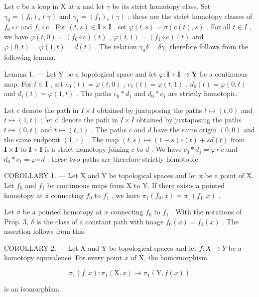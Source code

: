 Let c be a loop in X at x and let \(\gamma\) be its strict homotopy class. Set \(\gamma_{0} = (f_{0})_{*}(\gamma)\) and \(\gamma_{1} = (f_{1})_{*}(\gamma)\) ; these are the strict homotopy classes of \(f_{0} \circ c\) and \(f_{1} \circ c\) . For \((t, s) \in \mathbf{I} \times \mathbf{I}\) , set \(\varphi(t, s) = \sigma(c(t), s)\) . For all \(t \in I\) , we have \(\varphi(t, 0) = (f_{0} \circ c)(t)\) , \(\varphi(t, 1) = (f_{1} \circ c)(t)\) and \(\varphi(0, t) = \varphi(1, t) = d(t)\) . The relation \(\gamma_{0}\delta = \delta\gamma_{1}\) therefore follows from the following lemma.

Lemma 1. --- Let Y be a topological space and let \(\varphi\colon\mathbf{I}\times\mathbf{I}\to\mathbf{Y}\) be a continuous map. For \(t\in\mathbf{I}\) , set \(c_{0}(t)=\varphi(t,0)\) , \(c_{1}(t)=\varphi(t,1)\) , \(d_{0}(t)=\varphi(0,t)\) and \(d_{1}(t)=\varphi(1,t)\) . The paths \(c_{0}*d_{1}\) and \(d_{0}*c_{1}\) are strictly homotopic.

Let c denote the path in \(I \times I\) obtained by juxtaposing the paths \(t \mapsto (t,0)\) and \(t \mapsto (1,t)\) ; let d denote the path in \(I \times I\) obtained by juxtaposing the paths \(t \mapsto (0, t)\) and \(t \mapsto (t, 1)\) . The paths \(c\) and \(d\) have the same origin \((0, 0)\) and the same endpoint \((1, 1)\) . The map \((t, s) \mapsto (1 - s)c(t) + sd(t)\) from \(\mathbf{I} \times \mathbf{I}\) to \(\mathbf{I} \times \mathbf{I}\) is a strict homotopy joining \(c\) to \(d\) . We have \(c_0 * d_1 = \varphi \circ c\) and \(d_0 * c_1 = \varphi \circ d\) ; these two paths are therefore strictly homotopic.

COROLLARY 1. --- Let X and Y be topological spaces and let x be a point of X. Let \(f_0\) and \(f_1\) be continuous maps from X to Y. If there exists a pointed homotopy at x connecting \(f_0\) to \(f_1\) , we have \(\pi_1(f_0, x) = \pi_1(f_1, x)\) .

Let \(\sigma\) be a pointed homotopy at \(x\) connecting \(f_0\) to \(f_1\) . With the notations of Prop. 3, \(\delta\) is the class of a constant path with image \(f_0(x) = f_1(x)\) . The assertion follows from this.

COROLLARY 2. --- Let X and Y be topological spaces and let \(f\colon X \to Y\) be a homotopy equivalence. For every point \(x\) of X, the homomorphism

\[
\pi_ {1} (f, x) \colon \pi_ {1} (\mathrm{X}, x) \to \pi_ {1} (\mathrm{Y}, f (x))
\]

is an isomorphism.

